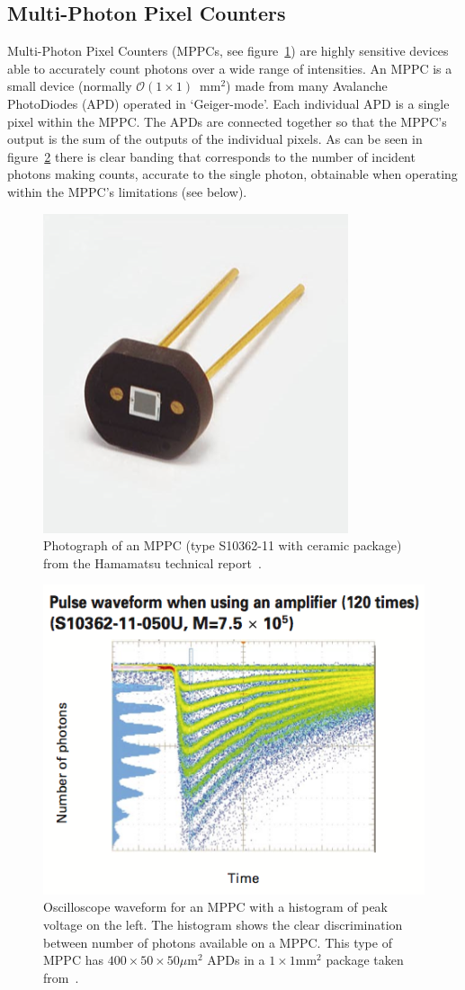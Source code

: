 \subsection{Multi-Photon Pixel Counters} %
\label{sub:multi_photon_pixel_counters}
Multi-Photon Pixel Counters (MPPCs, see figure~\ref{fig:images_intro_MPPC_from_hammamatsu_report}) are highly sensitive devices able to accurately count photons over a wide range of intensities. An MPPC is a small device (normally \( \mathcal{O}(1\times1) \)~mm\(^2\)) made from many Avalanche PhotoDiodes (APD) operated in `Geiger-mode'. Each individual APD is a single pixel within the MPPC. The APDs are connected together so that the MPPC's output is the sum of the outputs of the individual pixels. As can be seen in figure~\ref{fig:images_intro_hamamatsu_mppc_waveform_and_counts} there is clear banding that corresponds to the number of incident photons making counts, accurate to the single photon, obtainable when operating within the MPPC's limitations (see below).
\begin{figure}[hptb]
  \centering
    \includegraphics[width=.3\textwidth]{images/intro/MPPC_from_hammamatsu_report.png}
  \caption{Photograph of an MPPC (type S10362-11 with ceramic package) from the Hamamatsu technical report~\cite{hamamatsu_mppc}.}
  \label{fig:images_intro_MPPC_from_hammamatsu_report}
\end{figure}

\begin{figure}[hptb]
  \centering
    \includegraphics[width=.6\textwidth]{images/intro/hamamatsu_mppc_waveform_and_counts.png}
  \caption{Oscilloscope waveform for an MPPC with a histogram of peak voltage on the left. The histogram shows the clear discrimination between number of photons available on a MPPC. This type of MPPC has \(400\times50\times50 \mu\text{m}^2\) APDs in a \(1\times1\text{mm}^2\) package taken from~\cite{hamamatsu_mppc}.}
  \label{fig:images_intro_hamamatsu_mppc_waveform_and_counts}
\end{figure}

